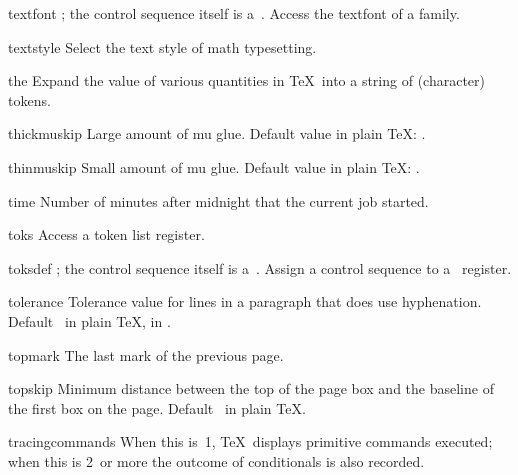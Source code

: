 \item textfont
      ; the control sequence itself
      is a~.
      Access the textfont of a family.

\item textstyle
      Select the text style of math typesetting.

\item the
      Expand the value of various quantities in \TeX\ into a string
      of (character) tokens.

\item thickmuskip
      Large amount of mu glue. 
      Default value in plain \TeX: .

\item thinmuskip
      Small amount of mu glue.
      Default value in plain \TeX: \n{3mu}.

\item time
      Number of minutes after midnight that the current job started.

\item toks
      Access a token list register.

\item toksdef
      ; the control sequence
      itself is a~.
      Assign a control sequence to
      a~ register.

\item tolerance
      Tolerance value for lines in a paragraph that does use hyphenation. 
      Default~ in plain \TeX,  in \IniTeX.

\item topmark
      The last mark of the previous page.

\item topskip
      Minimum distance between the top of the page box
      and the baseline of the first box on the page. 
      Default~\n{10pt} in plain \TeX.

\item tracingcommands
      When this is~1, \TeX\ displays primitive commands executed; 
      when this is 2~or more the outcome of conditionals is also recorded.

